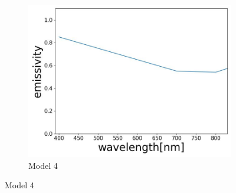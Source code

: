 \begin{figure}[htbp]
\begin{subfigure}{0.3\linewidth}
      \includegraphics[width=\linewidth]{figures/emissivity_24.jpg}
      \caption{Model 4}
      \label{fig: emi_24}
    \end{subfigure}
    
    \medskip
    

\end{figure}
